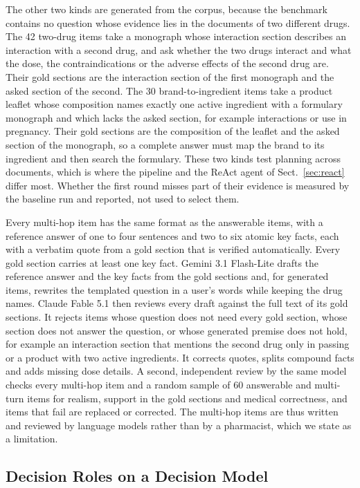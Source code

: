 The other two kinds are generated from the corpus, because the benchmark contains no question whose evidence lies in the documents of two different drugs. The 42 two-drug items take a monograph whose interaction section describes an interaction with a second drug, and ask whether the two drugs interact and what the dose, the contraindications or the adverse effects of the second drug are. Their gold sections are the interaction section of the first monograph and the asked section of the second. The 30 brand-to-ingredient items take a product leaflet whose composition names exactly one active ingredient with a formulary monograph and which lacks the asked section, for example interactions or use in pregnancy. Their gold sections are the composition of the leaflet and the asked section of the monograph, so a complete answer must map the brand to its ingredient and then search the formulary. These two kinds test planning across documents, which is where the pipeline and the ReAct agent of Sect.~\ref{sec:react} differ most. Whether the first round misses part of their evidence is measured by the baseline run and reported, not used to select them.

Every multi-hop item has the same format as the answerable items, with a reference answer of one to four sentences and two to six atomic key facts, each with a verbatim quote from a gold section that is verified automatically. Every gold section carries at least one key fact. Gemini 3.1 Flash-Lite drafts the reference answer and the key facts from the gold sections and, for generated items, rewrites the templated question in a user's words while keeping the drug names. Claude Fable 5.1 then reviews every draft against the full text of its gold sections. It rejects items whose question does not need every gold section, whose section does not answer the question, or whose generated premise does not hold, for example an interaction section that mentions the second drug only in passing or a product with two active ingredients. It corrects quotes, splits compound facts and adds missing dose details. A second, independent review by the same model checks every multi-hop item and a random sample of 60 answerable and multi-turn items for realism, support in the gold sections and medical correctness, and items that fail are replaced or corrected. The multi-hop items are thus written and reviewed by language models rather than by a pharmacist, which we state as a limitation.

\subsection{Decision Roles on a Decision Model}\label{sec:decision}

